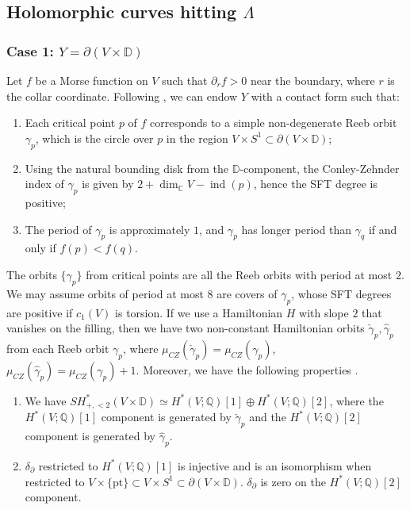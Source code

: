 \documentclass[reqno,11pt]{amsart}
\numberwithin{equation}{section}
\def\C{{\mathbb C}}
\def\D{{\mathbb D}}
\def\Q{{\mathbb Q}}
\DeclareMathOperator{\ind}{ind}
\begin{document}
\subsection{Holomorphic curves hitting $\Lambda$}\label{ss:41}
\subsubsection{Case 1: $Y=\partial(V\times \D)$} \label{ss:411}
 Let $f$ be a Morse function on $V$ such that $\partial_r f>0$ near the boundary, where $r$ is the collar coordinate. Following \cite[\S 2.1]{zbMATH07673358}, we can endow $Y$ with a contact form such that:
\begin{enumerate}
	\item Each critical point $p$ of $f$ corresponds to a simple non-degenerate Reeb orbit $\gamma_p$, which is the circle over $p$ in the region $V\times S^1\subset \partial(V\times \D)$;
	\item Using the natural bounding disk from the $\D$-component, the Conley-Zehnder index of $\gamma_p$ is given by $2+\dim_{\C}{V}-\ind(p)$, hence the SFT degree is positive;
	\item The period of $\gamma_p$ is approximately $1$, and $\gamma_p$ has longer period than $\gamma_q$ if and only if $f(p)<f(q)$. 
\end{enumerate}	
The orbits $\{\gamma_p\}$ from critical points are all the Reeb orbits with period at most $2$. We may assume orbits of period at most $8$ are covers of $\gamma_p$, whose SFT degrees are positive if $c_1(V)$ is torsion. If we use a Hamiltonian $H$ with slope $2$ that vanishes on the filling, then we have two non-constant Hamiltonian orbits $\check{\gamma}_p,\hat{\gamma}_p$ from each Reeb orbit $\gamma_p$, where $\mu_{CZ}(\check{\gamma}_p)=\mu_{CZ}(\gamma_p)$, $\mu_{CZ}(\hat{\gamma}_p)=\mu_{CZ}(\gamma_p)+1$. Moreover, we have the following properties \cite[Proposition 2.6]{zbMATH07673358}.
\begin{enumerate}
\item We have $SH^{*}_{+,<2}(V\times \D) \simeq H^*(V;\Q)[1]\oplus H^*(V;\Q)[2]$, where the $H^*(V;\Q)[1]$ component is generated by $\check{\gamma}_p$ and the $H^*(V;\Q)[2]$ component is generated by $\hat{\gamma}_p$.
\item $\delta_{\partial}$ restricted to $H^*(V;\Q)[1]$ is injective and is an isomorphism when restricted to $V\times \{\mathrm{pt}\}\subset V\times S^1\subset  \partial(V\times \D)$. $\delta_{\partial}$ is zero on the $H^*(V;\Q)[2]$ component. 
\end{enumerate}	
\end{document}
